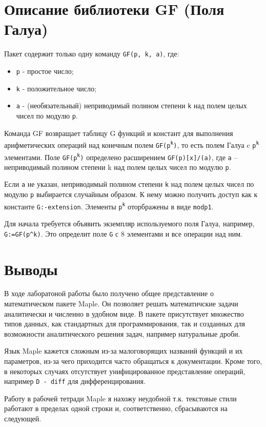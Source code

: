 \documentclass[a4paper,14pt]{extarticle}
\newcommand{\code}{\texttt}
\begin{document}
    \section{Описание библиотеки GF (Поля Галуа)}
    Пакет содержит только одну команду \code{GF(p, k, a)}, где:
    \begin{itemize}
        \item \code{p} - простое число;
        \item \code{k} - положительное число;
        \item \code{a} - (необязательный) неприводимый полином степени \code{k} над полем
              целых чисел по модулю \code{p}.
    \end{itemize}

    Команда GF возвращает таблицу G функций и констант для выполнения
    арифметических операций над конечным полем \code{GF(p\textsuperscript{k})},
    то есть полем Галуа c \code{p\textsuperscript{k}} элементами. Поле
    \code{GF(p\textsuperscript{k})} определено расширением \code{GF(p)[x]/(a)},
    где \code{a} -- неприводимый полином степени k над полем целых чисел по модулю \code{p}.

    Если \code{a} не указан, неприводимый полином степени \code{k} над полем целых чисел
    по модулю \code{p} выбирается случайным образом. К нему можно получить доступ как к
    константе \code{G:-extension}. Элементы \code{p\textsuperscript{k}} оторбражены в виде
    \code{modp1}.

    Для начала требуется объявить экземпляр используемого поля Галуа, например, \code{G:=GF(p\textasciicircum k)}.
    Это определит поле \code{G} с 8 элементами и все операции над ним.

    \section*{Выводы}
    В ходе лаборатоной работы было получено общее представление о математическом пакете Maple.
    Он позволяет решать математичские задачи аналитически и численно в удобном виде.
    В пакете присутствует множество типов данных, как стандартных для программирования,
    так и созданных для возможности аналитического решения задач, например натуральные дроби.

    Язык Maple кажется сложным из-за малоговорящих названий функций и их параметров,
    из-за чего приходится часто обращаться к документации. Кроме того, в некоторых
    случаях отсутствует унифицированное представление операций, например \code{D - diff}
    для дифференцирования.

    Работу в рабочей тетради Maple я нахожу неудобной т.к. текстовые стили работают
    в пределах одной строки и, соответственно, сбрасываются на следующей. 
\end{document}
